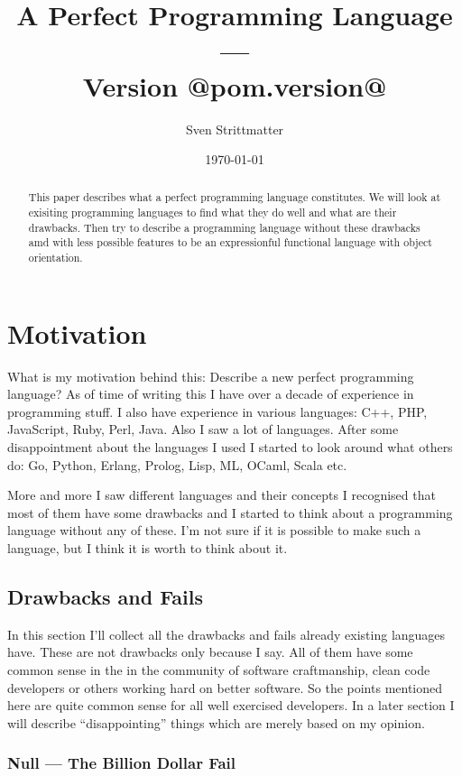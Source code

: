 \documentclass[12pt,a4paper]{report}
\title{%
    A Perfect Programming Language \\
    \large --- \\
    Version @pom.version@}
\author{Sven Strittmatter}
\date{\today}
\begin{document}
\maketitle

\begin{abstract}
This paper describes what a perfect programming language constitutes. We will look at exisiting programming languages to find what they do well and what are their drawbacks. Then try to describe a programming language  without these drawbacks amd with less possible features to be an expressionful functional language with object orientation.
\end{abstract}

\tableofcontents

\chapter{Motivation}

What is my motivation behind this: Describe a new perfect programming language? As of time of writing this I have over a decade of experience in programming stuff. I also have experience in various languages: C++, PHP, JavaScript, Ruby, Perl, Java. Also I saw a lot of languages. After some disappointment about the languages I used I started to look around what others do: Go, Python, Erlang, Prolog, Lisp, ML, OCaml, Scala etc.

More and more I saw different languages and their concepts I recognised that most of them have some drawbacks and I started to think about a programming language without any of these. I'm not sure if it is possible to make such a language, but I think it is worth to think about it.

\section{Drawbacks and Fails}

In this section I'll collect all the drawbacks and fails already existing languages have. These are not drawbacks only because I say. All of them have some common sense in the in the community of software craftmanship, clean code developers or others working hard on better software. So the points mentioned here are quite common sense for all well exercised developers. In a later section I will describe ``disappointing'' things which are merely based on my opinion.

\subsection{Null --- The Billion Dollar Fail}
\end{document}
